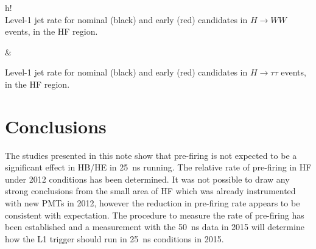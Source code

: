 \documentclass[11pt]{cmspaperpdf}
\begin{document}
\begin{2figures}{h!}
 \\
\caption{Level-1 jet rate for nominal (black) and early (red) candidates in $ H \rightarrow WW$ events, in the HF region.}\label{fig:p3_hf}  &
\caption{Level-1 jet rate for nominal (black) and early (red) candidates in $ H \rightarrow \tau \tau$ events, in the HF region.}\label{fig:p4_hf} 
\end{2figures}

\section{Conclusions}

The studies presented in this note show that pre-firing is not expected to be a significant effect in HB/HE in 25~ns running. The relative rate of pre-firing in HF under 2012 conditions has been determined. It was not possible to draw any strong conclusions from the small area of HF which was already instrumented with new PMTs in 2012, however the reduction in pre-firing rate appears to be consistent with expectation. The procedure to measure the rate of pre-firing has been established and a measurement with the 50~ns data in 2015 will determine how the L1 trigger should run in 25~ns conditions in 2015.
\end{document}

